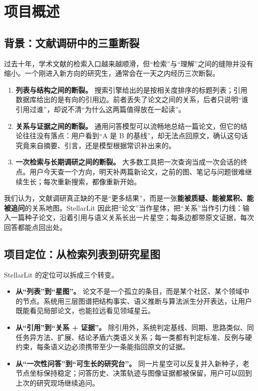 \section{项目概述}

\subsection{背景：文献调研中的三重断裂}

过去十年，学术文献的检索入口越来越顺滑，但“检索”与“理解”之间的缝隙并没有缩小。一个刚进入新方向的研究生，通常会在一天之内经历三次断裂。

\begin{enumerate}
  \item \textbf{列表与结构之间的断裂。} 搜索引擎给出的是按相关度排序的标题列表；引用数据库给出的是有向的引用边。前者丢失了论文之间的关系，后者只说明“谁引用过谁”，却说不清“为什么这两篇值得放在一起读”。
  \item \textbf{关系与证据之间的断裂。} 通用问答模型可以流畅地总结一篇论文，但它的结论往往没有落点：用户看到“A 是 B 的基线”，却无法点回原文，确认这句话究竟来自摘要、引言，还是模型根据常识补出来的。
  \item \textbf{一次检索与长期调研之间的断裂。} 大多数工具把一次查询当成一次会话的终点。用户今天查一个方向，明天补两篇新论文，之前的图、笔记与问题很难继续生长；每次重新搜索，都像重新开始。
\end{enumerate}

我们认为，文献调研真正缺的不是“更多结果”，而是一张\textbf{能被质疑、能被累积、能被追问}的关系地图。StellarLit 因此把“论文”当作星体，把“关系”当作引力线：输入一篇种子论文，沿着引用与语义关系长出一片星空；每条边都带原文证据，每次回答都能点回出处。

\subsection{项目定位：从检索列表到研究星图}

StellarLit 的定位可以拆成三个转变。

\begin{itemize}
  \item \textbf{从“列表”到“星图”。} 论文不是一个孤立的条目，而是某个社区、某个领域中的节点。系统用三层图谱把结构事实、语义推断与算法派生分开表达，让用户既能看见局部论文，也能拉远看见领域星云。
  \item \textbf{从“引用”到“关系 + 证据”。} 除引用外，系统判定基线、同期、思路类似、同任务异方法、扩展、结论矛盾六类语义关系；每一类都有判定标准、反例与硬约束，每条语义边必须携带至少一条能指回原文的证据。
  \item \textbf{从“一次性问答”到“可生长的研究台”。} 同一片星空可以反复并入新种子，老节点坐标保持稳定；问答历史、决策轨迹与图像证据都被保留，用户可以回到上次的研究现场继续追问。
\end{itemize}



